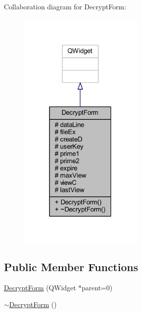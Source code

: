 Collaboration diagram for Decrypt\+Form\+:
\nopagebreak
\begin{figure}[H]
\begin{center}
\leavevmode
\includegraphics[width=174pt]{class_decrypt_form__coll__graph}
\end{center}
\end{figure}
\subsection*{Public Member Functions}
\begin{DoxyCompactItemize}
\item 
\hyperlink{class_decrypt_form_adedf517dfb4bb9411c4caf92943e7033}{Decrypt\+Form} (Q\+Widget $\ast$parent=0)
\item 
\hyperlink{class_decrypt_form_acbf539168ee44015720d6edb380ec4cf}{$\sim$\+Decrypt\+Form} ()
\end{DoxyCompactItemize}
